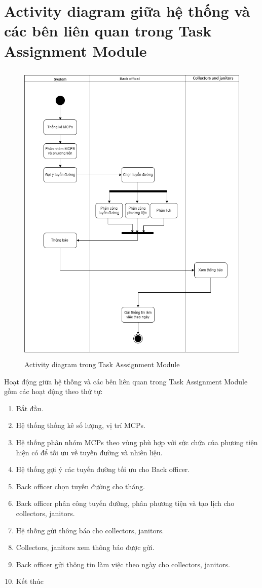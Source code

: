 
\section{Activity diagram giữa hệ thống và các bên liên quan trong Task Assignment Module}
    \begin{figure}[h]
        \centering
        \includegraphics[width=15.0cm,height=15cm]{imgs/activity diagram/activity diagram.png}
        \caption{Activity diagram trong Task Asssignment Module}
    \end{figure}
    \newpage
    Hoạt động giữa hệ thống và các bên liên quan trong Task Assignment Module gồm các hoạt động theo thứ tự:
    \begin{enumerate}
        \item Bắt đầu.
        \item Hệ thống thống kê số lượng, vị trí MCPs.
        \item Hệ thống phân nhóm MCPs theo vùng phù hợp với sức chứa của phương tiện hiện có để tối ưu về tuyến đường và nhiên liệu.
        \item Hệ thống gợi ý các tuyến đường tối ưu cho Back officer.
        \item Back officer chọn tuyến đường cho tháng.
        \item Back officer phân công tuyến đường, phân phương tiện và tạo lịch cho collectors, janitors.
        \item Hệ thống gửi thông báo cho collectors, janitors.
        \item  Collectors, janitors xem thông báo được gửi.
        \item Back officer gửi thông tin làm việc theo ngày cho collectors, janitors.
        \item Kết thúc
    \end{enumerate}
